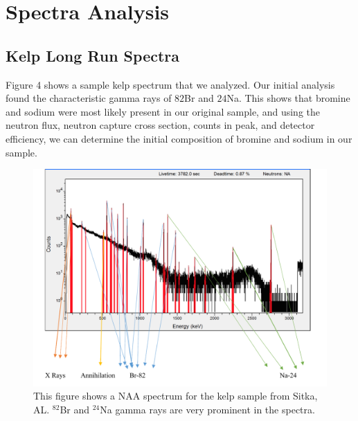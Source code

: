 \documentclass[]{article}
\begin{document}
\section{Spectra Analysis}
\subsection{Kelp Long Run Spectra}
Figure 4 shows a sample kelp spectrum that we analyzed. Our initial analysis found the characteristic gamma rays of ${82}$Br and ${24}$Na. This shows that bromine and sodium were most likely present in our original sample, and using the neutron flux, neutron capture cross section, counts in peak, and detector efficiency, we can determine the initial composition of bromine and sodium in our sample.

\begin{figure}[htb!]
\centering
\includegraphics[scale=0.5]{ExampleSpectra}
\caption{This figure shows a NAA spectrum for the kelp sample from Sitka, AL. $^{82}$Br and $^{24}$Na gamma rays are very prominent in the spectra.}
\end{figure} 
\pagebreak
\end{document}
